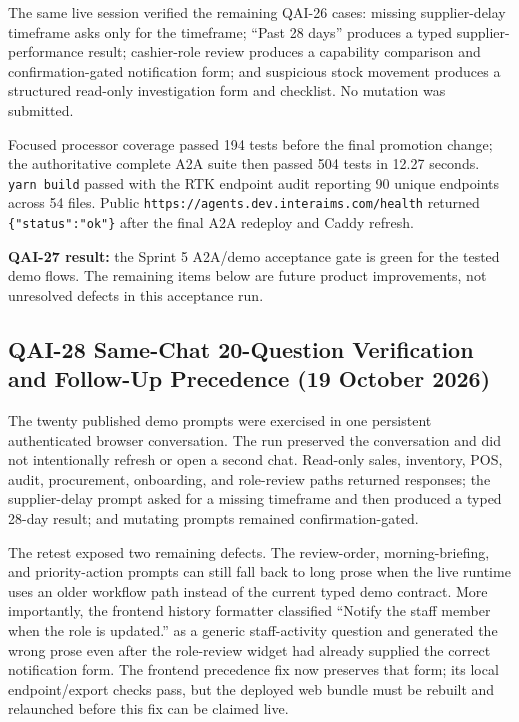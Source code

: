 \documentclass[10pt]{article}
\begin{document}
The same live session verified the remaining QAI-26 cases: missing supplier-delay timeframe asks only for the timeframe; ``Past 28 days'' produces a typed supplier-performance result; cashier-role review produces a capability comparison and confirmation-gated notification form; and suspicious stock movement produces a structured read-only investigation form and checklist. No mutation was submitted.

Focused processor coverage passed 194 tests before the final promotion change; the authoritative complete A2A suite then passed 504 tests in 12.27 seconds. \texttt{yarn build} passed with the RTK endpoint audit reporting 90 unique endpoints across 54 files. Public \texttt{https://agents.dev.interaims.com/health} returned \texttt{\{"status":"ok"\}} after the final A2A redeploy and Caddy refresh.

\textbf{QAI-27 result:} the Sprint 5 A2A/demo acceptance gate is green for the tested demo flows. The remaining items below are future product improvements, not unresolved defects in this acceptance run.

\subsection{QAI-28 Same-Chat 20-Question Verification and Follow-Up Precedence (19 October 2026)}
The twenty published demo prompts were exercised in one persistent authenticated browser conversation. The run preserved the conversation and did not intentionally refresh or open a second chat. Read-only sales, inventory, POS, audit, procurement, onboarding, and role-review paths returned responses; the supplier-delay prompt asked for a missing timeframe and then produced a typed 28-day result; and mutating prompts remained confirmation-gated.

The retest exposed two remaining defects. The review-order, morning-briefing, and priority-action prompts can still fall back to long prose when the live runtime uses an older workflow path instead of the current typed demo contract. More importantly, the frontend history formatter classified ``Notify the staff member when the role is updated.'' as a generic staff-activity question and generated the wrong prose even after the role-review widget had already supplied the correct notification form. The frontend precedence fix now preserves that form; its local endpoint/export checks pass, but the deployed web bundle must be rebuilt and relaunched before this fix can be claimed live.
\end{document}
